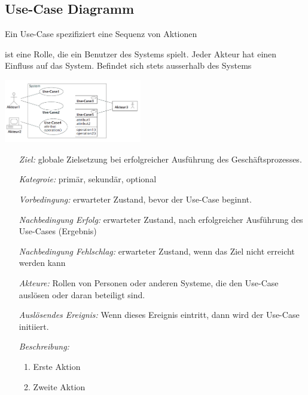 \subsection{Use-Case Diagramm }
	Ein Use-Case spezifiziert eine Sequenz von Aktionen
	\begin{description}[leftmargin=2.5cm]
		\item[Akteur]
      \parbox{7cm}{
        ist eine Rolle, die ein Benutzer des Systems spielt. Jeder Akteur hat einen 
        Einfluss auf das System. Befindet sich stets ausserhalb des Systems}
      \hspace{0.5cm}
      \parbox{6cm}{\includegraphics[width=6cm]{./bilder/UseCase_Notation.png}}
    \item[Schablone \Balzert{68}]
      \begin{itemize}[leftmargin=4cm]
        \item[\textit{Ziel:}]
          globale Zielsetzung bei erfolgreicher Ausführung des Geschäftsprozesses.
        \item[\textit{Kategroie:}]
          primär, sekundär, optional
        \item[\textit{Vorbedingung:}]
          erwarteter Zustand, bevor der Use-Case beginnt.
        \item[\textit{Nachbedingung Erfolg:}]
          erwarteter Zustand, nach erfolgreicher Ausführung des Use-Cases (Ergebnis)
        \item[\textit{Nachbedingung Fehlschlag:}]
          erwarteter Zustand, wenn das Ziel nicht erreicht werden kann
        \item[\textit{Akteure:}]
          Rollen von Personen oder anderen Systeme, die den Use-Case auslösen
          oder daran beteiligt sind.
        \item[\textit{Auslösendes Ereignis:}]
          Wenn dieses Ereignis eintritt, dann wird der Use-Case initiiert.
        \item[\textit{Beschreibung:}]
          \begin{enumerate}[leftmargin=0.5cm]
            \item Erste Aktion
            \item Zweite Aktion
          \end{enumerate}

\end{itemize}
\end{description}
